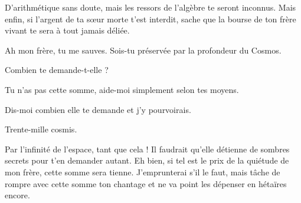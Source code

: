 \begin{drama}
  \elenaspeaks D’arithmétique sans doute, mais les ressors de l’algèbre te seront inconnus. Mais enfin, si l’argent de ta sœur morte t’est interdit, sache que la bourse de ton frère vivant te sera à tout jamais déliée.

  \vladimirspeaks Ah mon frère, tu me sauves. Sois-tu préservée par la profondeur du Cosmos.

  \elenaspeaks Combien te demande-t-elle ?

  \vladimirspeaks Tu n’as pas cette somme, aide-moi simplement selon tes moyens.

  \elenaspeaks Dis-moi combien elle te demande et j’y pourvoirais.

  \vladimirspeaks Trente-mille cosmis.

  \elenaspeaks Par l’infinité de l’espace, tant que cela ! Il faudrait qu’elle détienne de sombres secrets pour t’en demander autant. Eh bien, si tel est le prix de la quiétude de mon frère, cette somme sera tienne. J’emprunterai s’il le faut, mais tâche de rompre avec cette somme ton chantage et ne va point les dépenser en hétaïres encore.
\end{drama}

\scene

\StageDirII{\elena, \alexas}

